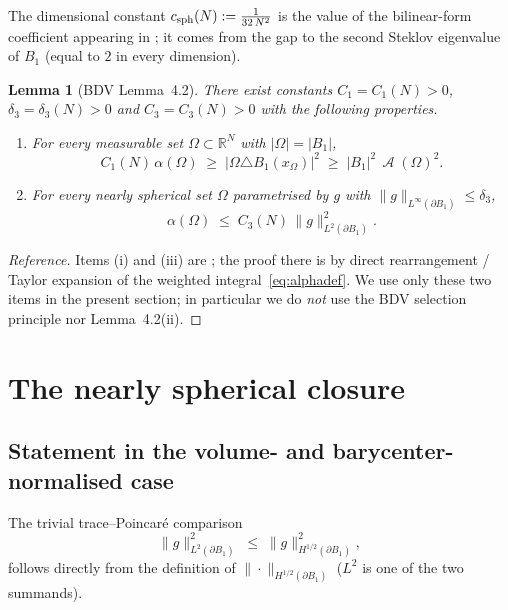 \documentclass[11pt]{article}
\newtheorem{lemma}[theorem]{Lemma}
\theoremstyle{definition}
\DeclareMathOperator{\Asym}{\mathcal{A}}
\newcommand{\bdy}{\partial}
\newcommand{\Rn}{\mathbb{R}^N}
\begin{document}
The dimensional constant
$c_{\rm sph}(N):=\tfrac{1}{32\,N^2}$ is the value of the bilinear-form
coefficient appearing in \cite[(3.9)--(3.10)]{BDV2013}; it comes from the
gap to the second Steklov eigenvalue of $B_1$ (equal to $2$ in every
dimension).

\begin{lemma}[BDV Lemma~4.2]\label{lem:BDV42}
There exist constants $C_1=C_1(N)>0$, $\delta_3=\delta_3(N)>0$ and
$C_3=C_3(N)>0$ with the following properties.
\begin{enumerate}
\item[\textup{(i)}] For every measurable set $\Omega\subset\Rn$ with
$|\Omega|=|B_1|$,
\begin{equation}\label{eq:BDV42i}
C_1(N)\,\alpha(\Omega)\;\ge\;|\Omega\triangle B_1(x_\Omega)|^2
\;\ge\;|B_1|^2\,\Asym(\Omega)^2.
\end{equation}
\item[\textup{(iii)}] For every nearly spherical set $\Omega$
parametrised by $g$ with $\|g\|_{L^\infty(\bdy B_1)}\le\delta_3$,
\begin{equation}\label{eq:BDV42iii}
\alpha(\Omega)\;\le\;C_3(N)\,\|g\|_{L^2(\bdy B_1)}^2.
\end{equation}
\end{enumerate}
\end{lemma}

\begin{proof}[Reference]
Items (i) and (iii) are \cite[Lemma~4.2~(i),(iii)]{BDV2013}; the proof
there is by direct rearrangement / Taylor expansion of the weighted
integral~\eqref{eq:alphadef}. We use only these two items in the present
section; in particular we do \emph{not} use the BDV selection principle
nor Lemma~4.2(ii).
\end{proof}

\section{The nearly spherical closure}\label{sec:closure}

\subsection{Statement in the volume- and barycenter-normalised case}

The trivial trace--Poincar\'e comparison
\begin{equation}\label{eq:Hhalfvsi2}
\|g\|_{L^2(\bdy B_1)}^2 \;\le\; \|g\|_{H^{1/2}(\bdy B_1)}^2,
\end{equation}
follows directly from the definition of $\|\cdot\|_{H^{1/2}(\bdy B_1)}$
($L^2$ is one of the two summands).
\end{document}
